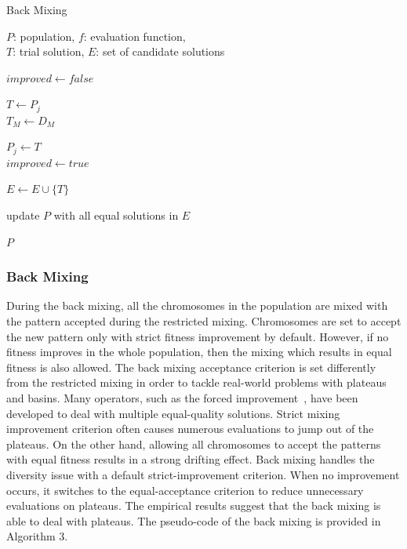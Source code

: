 \documentclass{sig-alternate-05-2015}
\begin{document}
\begin{algorithm}[t!]
\caption{Back Mixing}\label{algo_disjdecomp}

$P$: population, $f$: evaluation function, \\
$T$: trial solution, $E$: set of candidate solutions 


\BlankLine

$improved  \leftarrow false$ \\
 {

    $T \leftarrow P_j$ \\
    $T_M \leftarrow D_M$ \\

     {

        $P_j \leftarrow T$ \\
        $improved  \leftarrow true$ \\
    }{
         {
            $E \leftarrow E \cup \{T\}$ \\
        }
    }
}
 {
    update $P$ with all equal solutions in $E$ \\
} 

\Return $P$

\end{algorithm} 

\subsubsection{Back Mixing}

During the back mixing, all the chromosomes in the population are mixed with the pattern accepted during the restricted mixing. Chromosomes are set to accept the new pattern only with strict fitness improvement by default. However, if no fitness improves in the whole population, then the mixing which results in equal fitness is also allowed. The back mixing acceptance criterion is set differently from the restricted mixing in order to tackle real-world problems with plateaus and basins. Many operators, such as the forced improvement~\cite{bosman:LT-GOMEA}, have been developed to deal with multiple equal-quality solutions. Strict mixing improvement criterion often causes numerous evaluations to jump out of the plateaus. On the other hand, allowing all chromosomes to accept the patterns with equal fitness results in a strong drifting effect. Back mixing handles the diversity issue with a default strict-improvement criterion. When no improvement occurs, it switches to the equal-acceptance criterion to reduce unnecessary evaluations on plateaus. The empirical results suggest that the back mixing is able to deal with plateaus. The pseudo-code of the back mixing is provided in Algorithm 3. 
\end{document}
